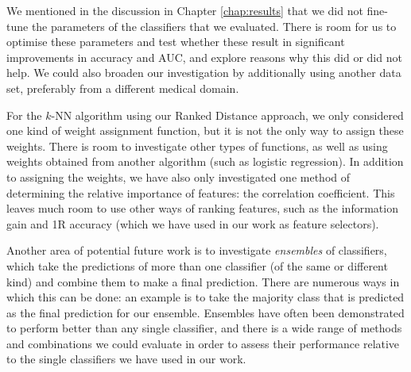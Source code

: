 We mentioned in the discussion in Chapter \ref{chap:results} that we did not
fine-tune the parameters of the classifiers that we evaluated. There is room
for us to optimise these parameters and test whether these result in
significant improvements in accuracy and AUC, and explore reasons why this
did or did not help. We could also broaden our investigation by additionally
using another data set, preferably from a different medical domain.

For the $k$-NN algorithm using our Ranked Distance approach, we only considered
one kind of weight assignment function, but it is not the only way to assign
these weights. There is room to investigate other types of functions, as well
as using weights obtained from another algorithm (such as logistic regression).
In addition to assigning the weights, we have also only investigated one method
of determining the relative importance of features: the correlation coefficient.
This leaves much room to use other ways of ranking features, such as the
information gain and 1R accuracy (which we have used in our work as feature
selectors).

Another area of potential future work is to investigate \textit{ensembles} of
classifiers, which take the predictions of more than one classifier (of the
same or different kind) and combine them to make a final prediction. There are
numerous ways in which this can be done: an example is to take the majority
class that is predicted as the final prediction for our ensemble. Ensembles
have often been demonstrated to perform better than any single classifier,
and there is a wide range of methods and combinations we could evaluate in
order to assess their performance relative to the single classifiers we have
used in our work.
